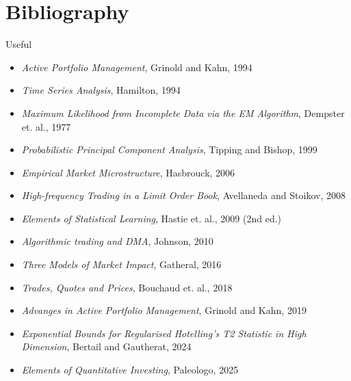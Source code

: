 \documentclass{beamer}
\begin{document}
\section{Bibliography}
\begin{frame}{Useful}
	\begin{itemize}
		\item \textit{Active Portfolio Management}, Grinold and Kahn, 1994
		\item \textit{Time Series Analysis}, Hamilton, 1994
		\item \textit{Maximum Likelihood from Incomplete Data via the EM Algorithm}, Dempster et. al., 1977
		\item \textit{Probabilistic Principal Component Analysis}, Tipping and Bishop, 1999
		\item \textit{Empirical Market Microstructure}, Hasbrouck, 2006
		\item \textit{High-frequency Trading in a Limit Order Book}, Avellaneda and Stoikov, 2008
		\item \textit{Elements of Statistical Learning}, Hastie et. al., 2009 (2nd ed.)
		\item \textit{Algorithmic trading and DMA}, Johnson, 2010
		\item \textit{Three Models of Market Impact}, Gatheral, 2016
		\item \textit{Trades, Quotes and Prices}, Bouchaud et. al., 2018
		\item \textit{Advanges in Active Portfolio Management}, Grinold and Kahn, 2019
		\item \textit{Exponential Bounds for Regularised Hotelling's T2 Statistic in High Dimension}, Bertail and Gautherat, 2024
		\item \textit{Elements of Quantitative Investing}, Paleologo, 2025
	\end{itemize}
\end{frame}
\end{document}
